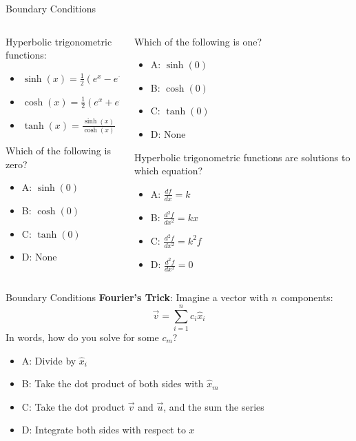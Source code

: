 \documentclass{beamer}
\begin{document}
\begin{frame}{Boundary Conditions}
\begin{columns}[T]
\begin{column}{0.5\textwidth}
Hyperbolic trigonometric functions:
\begin{itemize}
\item $\sinh(x) = \frac{1}{2}\left( e^{x} - e^{-x} \right)$
\item $\cosh(x) = \frac{1}{2}\left( e^{x} + e^{-x} \right)$
\item $\tanh(x) = \frac{\sinh(x)}{\cosh(x)}$
\end{itemize} \vspace{0.5cm}
Which of the following is zero?
\begin{itemize}
\item A: $\sinh(0)$
\item B: $\cosh(0)$
\item C: $\tanh(0)$
\item D: None
\end{itemize}
\end{column}
\begin{column}{0.5\textwidth}
Which of the following is one?
\begin{itemize}
\item A: $\sinh(0)$
\item B: $\cosh(0)$
\item C: $\tanh(0)$
\item D: None
\end{itemize}
Hyperbolic trigonometric functions are solutions to which equation?
\begin{itemize}
\item A: $\frac{df}{dx} = k$
\item B: $\frac{d^2f}{dx^2} = kx$
\item C: $\frac{d^2f}{dx^2} = k^2f$
\item D: $\frac{d^2f}{dx^2} = 0$
\end{itemize}
\end{column}
\end{columns}
\end{frame}

\begin{frame}{Boundary Conditions}
\alert{\textbf{Fourier's Trick}}: Imagine a vector with $n$ components:
\begin{equation}
\vec{v} = \sum_{i = 1}^n c_i \hat{x}_i
\end{equation}
In words, how do you solve for some $c_m$?
\begin{itemize}
\item A: Divide by $\hat{x}_i$
\item B: Take the dot product of both sides with $\hat{x}_{m}$
\item C: Take the dot product $\vec{v}$ and $\vec{u}$, and the sum the series
\item D: Integrate both sides with respect to $x$
\end{itemize}
\end{frame}
\end{document}
